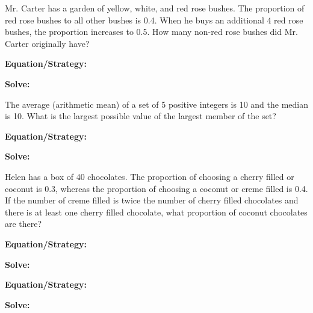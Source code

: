 \vfill
\newpage
\begin{multicols*}{2}
\begin{outline}[enumerate]
\medium

\1 Mr. Carter has a garden of yellow, white, and red rose bushes. The proportion of red rose bushes to all other bushes is 0.4. When he buys an additional 4 red rose bushes, the proportion increases to 0.5. How many non-red rose bushes did Mr. Carter originally have?

\bigskip
\textbf{Equation/Strategy:} \hrulefill

\bigskip
\textbf{Solve:}

\vfill
{}

\midline

\1 The average (arithmetic mean) of a set of 5 positive integers is 10 and the median is 10. What is the largest possible value of the largest member of the set?

\bigskip
\textbf{Equation/Strategy:} \hrulefill

\bigskip
\textbf{Solve:}

\vfill
{}

\columnbreak
\advanced

\1 Helen has a box of 40 chocolates. The proportion of choosing a cherry filled or coconut is 0.3, whereas the proportion of choosing a coconut or creme filled is 0.4. If the number of creme filled is twice the number of cherry filled chocolates and there is at least one cherry filled chocolate, what proportion of coconut chocolates are there?

\bigskip
\textbf{Equation/Strategy:} \hrulefill

\bigskip
\textbf{Solve:}

\vfill
{}

\midline

\1 

\bigskip
\textbf{Equation/Strategy:} \hrulefill

\bigskip
\textbf{Solve:}

\vfill
{}
\end{outline}
\end{multicols*}